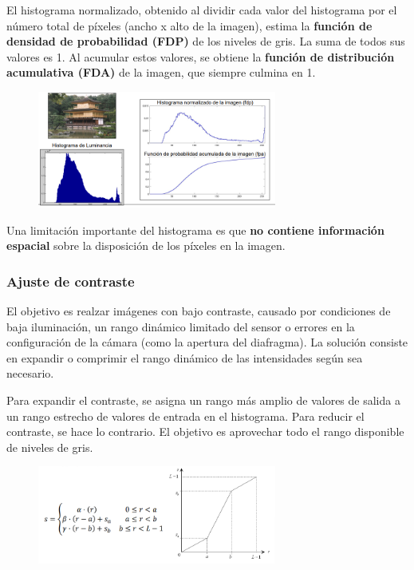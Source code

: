 El histograma normalizado, obtenido al dividir cada valor del histograma por el número total de píxeles (ancho x alto de la imagen), estima la \textbf{función de densidad de probabilidad (FDP)} de los niveles de gris. La suma de todos sus valores es 1. Al acumular estos valores, se obtiene la \textbf{función de distribución acumulativa (FDA)} de la imagen, que siempre culmina en 1.

\begin{figure}[h]
\centering
\includegraphics[width = 0.7\textwidth]{figs/fdp-fpa.png}
\end{figure}

Una limitación importante del histograma es que \textbf{no contiene información espacial} sobre la disposición de los píxeles en la imagen.

\subsubsection{Ajuste de contraste}
El objetivo es realzar imágenes con bajo contraste, causado por condiciones de baja iluminación, un rango dinámico limitado del sensor o errores en la configuración de la cámara (como la apertura del diafragma). La solución consiste en expandir o comprimir el rango dinámico de las intensidades según sea necesario.

Para expandir el contraste, se asigna un rango más amplio de valores de salida a un rango estrecho de valores de entrada en el histograma. Para reducir el contraste, se hace lo contrario. El objetivo es aprovechar todo el rango disponible de niveles de gris.

\begin{figure}[h]
\centering
\includegraphics[width = 0.7\textwidth]{figs/ajuste-contraste.png}
\end{figure}

